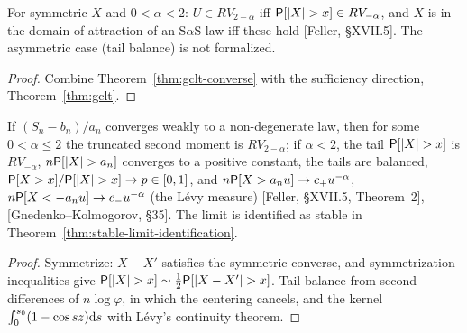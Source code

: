 \begin{theorem}
  \label{thm:feller-criterion}
  \leanok
  For symmetric $X$ and $0 < \alpha < 2$: $U \in RV_{2-\alpha}$ iff $\mathsf{P}[|X| > x] \in RV_{-\alpha}$, and $X$ is in the domain of
  attraction of an S$\alpha$S law iff these hold [Feller, \S XVII.5]. The asymmetric case (tail balance) is not
  formalized.
\end{theorem}
\begin{proof}
  \leanok
  Combine Theorem~\ref{thm:gclt-converse} with the sufficiency direction, Theorem~\ref{thm:gclt}.
\end{proof}

\begin{theorem}
  \label{thm:gclt-converse-asymmetric}
  \leanok
  If $(S_n - b_n)/a_n$ converges weakly to a non-degenerate law, then for some $0 < \alpha \le 2$ the truncated second moment
  is $RV_{2-\alpha}$; if $\alpha < 2$, the tail $\mathsf{P}[|X| > x]$ is $RV_{-\alpha}$, $n\mathsf{P}[|X| > a_n]$ converges to a positive
  constant, the tails are balanced, $\mathsf{P}[X > x]/\mathsf{P}[|X| > x] \to p \in [0, 1]$, and $n\mathsf{P}[X > a_n u] \to c_+ u^{-\alpha}$,
  $n\mathsf{P}[X < -a_n u] \to c_- u^{-\alpha}$ (the L\'evy measure) [Feller, \S XVII.5, Theorem~2], [Gnedenko--Kolmogorov,
  \S35]. The limit is identified as stable in Theorem~\ref{thm:stable-limit-identification}.
\end{theorem}
\begin{proof}
  \leanok
  Symmetrize: $X - X'$ satisfies the symmetric converse, and symmetrization inequalities give
  $\mathsf{P}[|X| > x] \sim \frac12 \mathsf{P}[|X - X'| > x]$. Tail balance from second differences of $n \log \varphi$, in which the
  centering cancels, and the kernel $\int_0^{s_0} (1 - \cos sz) \mathrm{d} s$ with L\'evy's continuity theorem.
\end{proof}

